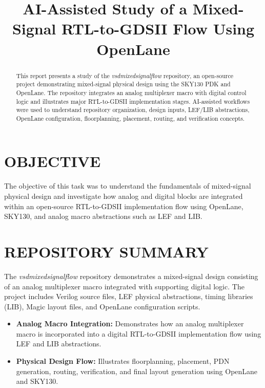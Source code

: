 \documentclass[conference]{IEEEtran}
\begin{document}
\title{\fontsize{17}{23}\selectfont{}\bfseries AI-Assisted Study of a Mixed-Signal RTL-to-GDSII Flow Using OpenLane}

\maketitle

\begin{abstract}
This report presents a study of the \textit{vsdmixedsignalflow} repository, an open-source project demonstrating mixed-signal physical design using the SKY130 PDK and OpenLane. The repository integrates an analog multiplexer macro with digital control logic and illustrates major RTL-to-GDSII implementation stages. AI-assisted workflows were used to understand repository organization, design inputs, LEF/LIB abstractions, OpenLane configuration, floorplanning, placement, routing, and verification concepts.
\end{abstract}

\section{\bfseries\MakeUppercase{Objective}}

{\fontsize{9.7}{15}\selectfont The objective of this task was to understand the fundamentals of mixed-signal physical design and investigate how analog and digital blocks are integrated within an open-source RTL-to-GDSII implementation flow using OpenLane, SKY130, and analog macro abstractions such as LEF and LIB.}

\section{\bfseries \MakeUppercase{Repository Summary}}

{\fontsize{9.7}{15}\selectfont The \textit{vsdmixedsignalflow} repository demonstrates a mixed-signal design consisting of an analog multiplexer macro integrated with supporting digital logic. The project includes Verilog source files, LEF physical abstractions, timing libraries (LIB), Magic layout files, and OpenLane configuration scripts.}

\begin{itemize}
\item {\fontsize{9.7}{15}\selectfont \textbf{Analog Macro Integration:} Demonstrates how an analog multiplexer macro is incorporated into a digital RTL-to-GDSII implementation flow using LEF and LIB abstractions.}
\item {\fontsize{9.7}{15}\selectfont \textbf{Physical Design Flow:} Illustrates floorplanning, placement, PDN generation, routing, verification, and final layout generation using OpenLane and SKY130.}
\end{itemize}
\end{document}
